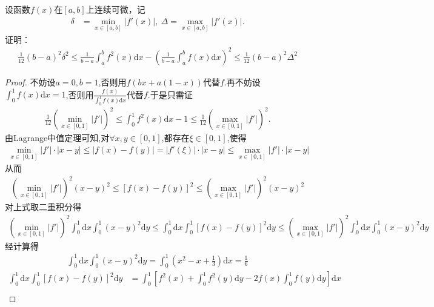 \documentclass[../../main.tex]{subfiles}%
\begin{document}
\begin{example}
设函数$f(x)$在$[a,b]$上连续可微，记
\begin{align*}
\delta &= \min_{x\in[a,b]} |f'(x)|, \ \Delta = \max_{x\in[a,b]} |f'(x)|.
\end{align*}
证明：
\begin{align*}
\frac{1}{12}(b - a)^2\delta^2 \leqslant \frac{1}{b - a}\int_a^b f^2(x)\mathrm{d}x - \left( \frac{1}{b - a}\int_a^b f(x)\mathrm{d}x \right)^2 \leqslant \frac{1}{12}(b - a)^2\Delta^2
\end{align*}
\end{example}
\begin{proof}
不妨设$a=0,b=1$,否则用$f(bx+a(1-x))$代替$f$.再不妨设$\int_0^1 f(x)\mathrm{d}x=1$,否则用$\frac{f(x)}{\int_0^1 f(x)\mathrm{d}x}$代替$f$.于是只需证
\begin{align*}
\frac{1}{12}\left( \min\limits_{x\in[0,1]} |f'| \right)^2 \leqslant \int_0^1 f^2(x)\mathrm{d}x - 1 \leqslant \frac{1}{12}\left( \max\limits_{x\in[0,1]} |f'| \right)^2.
\end{align*}
由Lagrange中值定理可知,对$\forall x,y\in[0,1]$,都存在$\xi\in[0,1]$,使得
\begin{align*}
\min\limits_{x\in[0,1]} |f'| \cdot |x - y| \leqslant |f(x) - f(y)| = |f'(\xi)| \cdot |x - y| \leqslant \max\limits_{x\in[0,1]} |f'| \cdot |x - y|
\end{align*}
从而
\begin{align*}
\left( \min\limits_{x\in[0,1]} |f'| \right)^2 (x - y)^2 \leqslant [f(x) - f(y)]^2 \leqslant \left( \max\limits_{x\in[0,1]} |f'| \right)^2 (x - y)^2
\end{align*}
对上式取二重积分得
\begin{align}
\left( \min\limits_{x\in[0,1]} |f'| \right)^2 \int_0^1 \mathrm{d}x \int_0^1 (x - y)^2 \mathrm{d}y \leqslant \int_0^1 \mathrm{d}x \int_0^1 [f(x) - f(y)]^2 \mathrm{d}y \leqslant \left( \max\limits_{x\in[0,1]} |f'| \right)^2 \int_0^1 \mathrm{d}x \int_0^1 (x - y)^2 \mathrm{d}y \label{eq:fwr3-vke9-kk34g4k::if9k2r321.1}
\end{align}
经计算得
\begin{align*}
\int_0^1 \mathrm{d}x \int_0^1 (x - y)^2 \mathrm{d}y = \int_0^1 \left( x^2 - x + \frac{1}{3} \right) \mathrm{d}x = \frac{1}{6}
\end{align*}
\begin{align*}
\int_0^1 \mathrm{d}x \int_0^1 [f(x) - f(y)]^2 \mathrm{d}y &= \int_0^1 \left[ f^2(x) + \int_0^1 f^2(y) \mathrm{d}y - 2f(x) \int_0^1 f(y) \mathrm{d}y \right] \mathrm{d}x \\

\end{align*}
\end{proof}
\end{document}
